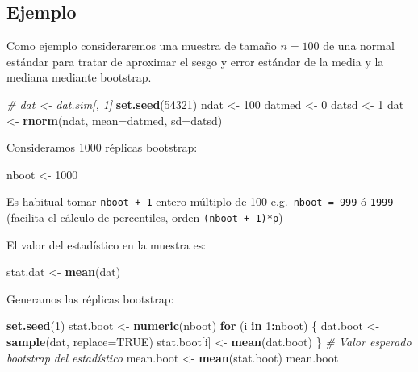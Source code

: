 \documentclass[
]{book}
\newenvironment{Shaded}{\begin{snugshade}}{\end{snugshade}}
\newcommand{\CommentTok}[1]{\textcolor[rgb]{0.56,0.35,0.01}{\textit{#1}}}
\newcommand{\ControlFlowTok}[1]{\textcolor[rgb]{0.13,0.29,0.53}{\textbf{#1}}}
\newcommand{\DataTypeTok}[1]{\textcolor[rgb]{0.13,0.29,0.53}{#1}}
\newcommand{\DecValTok}[1]{\textcolor[rgb]{0.00,0.00,0.81}{#1}}
\newcommand{\KeywordTok}[1]{\textcolor[rgb]{0.13,0.29,0.53}{\textbf{#1}}}
\newcommand{\NormalTok}[1]{#1}
\newcommand{\OperatorTok}[1]{\textcolor[rgb]{0.81,0.36,0.00}{\textbf{#1}}}
\newcommand{\OtherTok}[1]{\textcolor[rgb]{0.56,0.35,0.01}{#1}}
\newcommand{\StringTok}[1]{\textcolor[rgb]{0.31,0.60,0.02}{#1}}
\theoremstyle{break}
\theoremstyle{definition}
\theoremstyle{definition}
\theoremstyle{definition}
\theoremstyle{remark}
\begin{document}
\hypertarget{ejemplo}{%
\subsection{Ejemplo}\label{ejemplo}}

Como ejemplo consideraremos una muestra de tamaño \(n=100\) de una normal
estándar para tratar de aproximar el sesgo y error estándar de la media y la mediana
mediante bootstrap.

\begin{Shaded}
\begin{Highlighting}[]
\CommentTok{# dat <- dat.sim[, 1]}
\KeywordTok{set.seed}\NormalTok{(}\DecValTok{54321}\NormalTok{)}
\NormalTok{ndat <-}\StringTok{ }\DecValTok{100}
\NormalTok{datmed <-}\StringTok{ }\DecValTok{0}
\NormalTok{datsd <-}\StringTok{ }\DecValTok{1}
\NormalTok{dat <-}\StringTok{ }\KeywordTok{rnorm}\NormalTok{(ndat, }\DataTypeTok{mean=}\NormalTok{datmed, }\DataTypeTok{sd=}\NormalTok{datsd)}
\end{Highlighting}
\end{Shaded}

Consideramos 1000 réplicas bootstrap:

\begin{Shaded}
\begin{Highlighting}[]
\NormalTok{nboot <-}\StringTok{ }\DecValTok{1000}  
\end{Highlighting}
\end{Shaded}

Es habitual tomar \texttt{nboot\ +\ 1} entero múltiplo de 100 e.g.~\texttt{nboot\ =\ 999} ó \texttt{1999}
(facilita el cálculo de percentiles, orden \texttt{(nboot\ +\ 1)*p})

El valor del estadístico en la muestra es:

\begin{Shaded}
\begin{Highlighting}[]
\NormalTok{stat.dat <-}\StringTok{ }\KeywordTok{mean}\NormalTok{(dat)}
\end{Highlighting}
\end{Shaded}

Generamos las réplicas bootstrap:

\begin{Shaded}
\begin{Highlighting}[]
\KeywordTok{set.seed}\NormalTok{(}\DecValTok{1}\NormalTok{)}
\NormalTok{stat.boot <-}\StringTok{ }\KeywordTok{numeric}\NormalTok{(nboot)}
\ControlFlowTok{for}\NormalTok{ (i }\ControlFlowTok{in} \DecValTok{1}\OperatorTok{:}\NormalTok{nboot) \{}
\NormalTok{  dat.boot <-}\StringTok{ }\KeywordTok{sample}\NormalTok{(dat, }\DataTypeTok{replace=}\OtherTok{TRUE}\NormalTok{)}
\NormalTok{  stat.boot[i] <-}\StringTok{ }\KeywordTok{mean}\NormalTok{(dat.boot)}
\NormalTok{\}}
\CommentTok{# Valor esperado bootstrap del estadístico}
\NormalTok{mean.boot <-}\StringTok{ }\KeywordTok{mean}\NormalTok{(stat.boot)  }
\NormalTok{mean.boot}
\end{Highlighting}
\end{Shaded}
\end{document}

